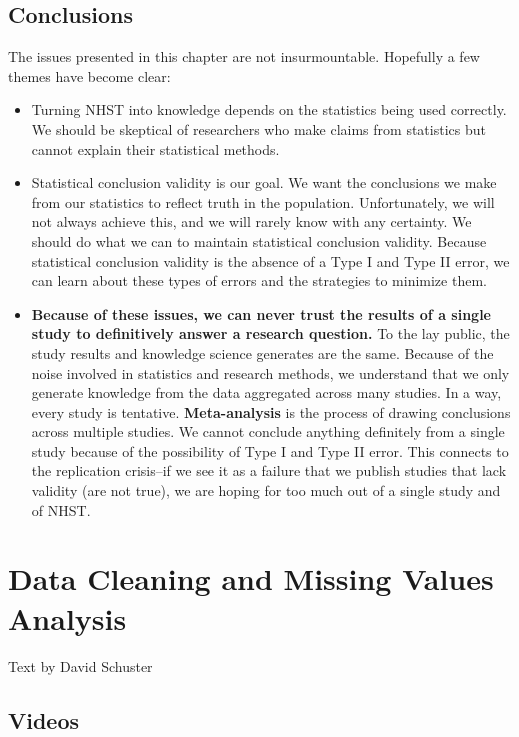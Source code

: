 \documentclass[
]{book}
\begin{document}
\hypertarget{conclusions}{%
\section{Conclusions}\label{conclusions}}

The issues presented in this chapter are not insurmountable. Hopefully a few themes have become clear:

\begin{itemize}
\item
  Turning NHST into knowledge depends on the statistics being used correctly. We should be skeptical of researchers who make claims from statistics but cannot explain their statistical methods.
\item
  Statistical conclusion validity is our goal. We want the conclusions we make from our statistics to reflect truth in the population. Unfortunately, we will not always achieve this, and we will rarely know with any certainty. We should do what we can to maintain statistical conclusion validity. Because statistical conclusion validity is the absence of a Type I and Type II error, we can learn about these types of errors and the strategies to minimize them.
\item
  \textbf{Because of these issues, we can never trust the results of a single study to definitively answer a research question.} To the lay public, the study results and knowledge science generates are the same. Because of the noise involved in statistics and research methods, we understand that we only generate knowledge from the data aggregated across many studies. In a way, every study is tentative. \textbf{Meta-analysis} is the process of drawing conclusions across multiple studies. We cannot conclude anything definitely from a single study because of the possibility of Type I and Type II error. This connects to the replication crisis--if we see it as a failure that we publish studies that lack validity (are not true), we are hoping for too much out of a single study and of NHST.
\end{itemize}

\hypertarget{data-cleaning-and-missing-values-analysis}{%
\chapter{Data Cleaning and Missing Values Analysis}\label{data-cleaning-and-missing-values-analysis}}

Text by David Schuster

\hypertarget{videos-5}{%
\section{Videos}\label{videos-5}}
\end{document}

